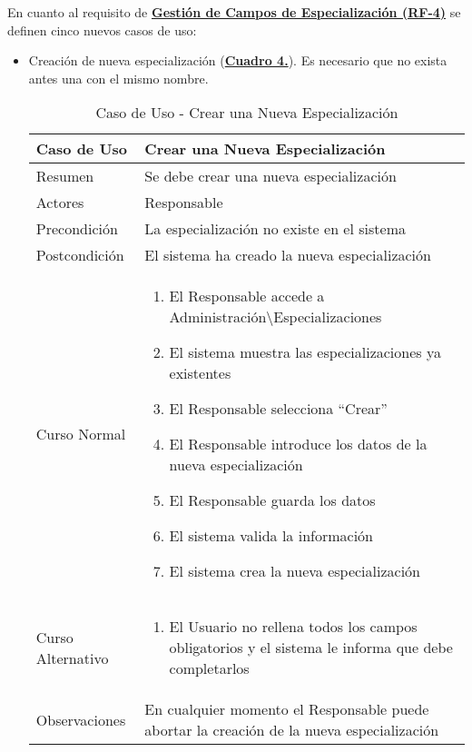 \pagebreak
En cuanto al requisito de \textbf{\hyperref[tab:rfGestEspec]{Gestión de Campos de Especialización (RF-4)}} se definen cinco nuevos casos de uso:
\begin{itemize}
	\item \addtocounter{tabla}{1} Creación de nueva especialización (\textbf{\hyperref[tab:curCrearEspec]{Cuadro 4.}}). Es necesario que no exista antes una con el mismo nombre.
		\begin{table}[!htbp]
		  \centering  \addtocounter{casouso}{1}
		  \begin{tabular}{|l | p{100mm}|}
		    \textbf{Caso de Uso}  & \textbf{Crear una Nueva Especialización} \\ \hline
		    Resumen 		 & Se debe crear una nueva especialización \\ \hline
		    Actores  		 & Responsable \\ \hline
		    Precondición  	 & La especialización no existe en el sistema  \\ \hline
		    Postcondición  	 & El sistema ha creado la nueva especialización \\ \hline
		    Curso Normal   	 & \begin{enumerate}
			  \item El Responsable accede a Administración\textbackslash Especializaciones
			  \item El sistema muestra las especializaciones ya existentes
			  \item El Responsable selecciona ``Crear''
			  \item El Responsable introduce los datos de la nueva especialización
			  \item El Responsable guarda los datos
			  \item El sistema valida la información
			  \item El sistema crea la nueva especialización
		    \end{enumerate}  \\ \hline
		    Curso Alternativo  & \begin{enumerate}
			  \item El Usuario no rellena todos los campos obligatorios y el sistema le informa que debe completarlos
		    \end{enumerate}  \\ \hline
		    Observaciones 	 & En cualquier momento el Responsable puede abortar la creación de la nueva especialización  \\ 		\hline
		  \end{tabular}
		  \caption{Caso de Uso  - Crear una Nueva Especialización }
		  \label{tab:curCrearEspec}
		\end{table}
		\FloatBarrier
	

\end{itemize}
